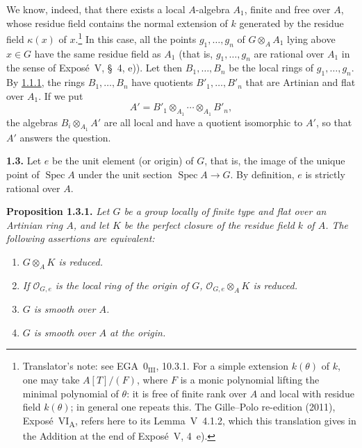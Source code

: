 \medskip
We know, indeed, that there exists a local \(A\)-algebra \(A_1\), finite
and free over \(A\), whose residue field contains the normal extension of
\(k\) generated by the residue field \(\kappa(x)\) of \(x\).\footnote{Translator's note: see EGA~\(0_{\mathrm{III}}\), 10.3.1. For a simple
extension \(k(\theta)\) of \(k\), one may take \(A[T]/(F)\), where \(F\) is a monic polynomial lifting
the minimal polynomial of \(\theta\): it is free of finite rank over \(A\) and local with residue
field \(k(\theta)\); in general one repeats this. The Gille--Polo re-edition (2011),
Exposé~VI\textsubscript{A}, refers here to its Lemma~V~4.1.2, which this translation gives in the
Addition at the end of Exposé~V, 4~e).} In this case, all the
points \(g_1,\ldots,g_n\) of \(G\otimes_A A_1\) lying above \(x\in G\)
have the same residue field as \(A_1\) (that is, \(g_1,\ldots,g_n\) are rational
over \(A_1\) in the sense of Expos\'e~V, \S~4, e)).
Let then \(B_1,\ldots,B_n\) be the local rings of \(g_1,\ldots,g_n\).
By \hyperref[prop:sga3-VIA-1.1.1]{1.1.1}, the rings
\(B_1,\ldots,B_n\) have quotients \(B'_1,\ldots,B'_n\) that are Artinian
and flat over \(A_1\). If we put
\[
  A'=B'_1\otimes_{A_1}\cdots\otimes_{A_1}B'_n,
\]
the algebras \(B_i\otimes_{A_1}A'\) are all local and have a quotient
isomorphic to \(A'\), so that \(A'\) answers the question.

\medskip
{}\label{par:sga3-VIA-1.3}%
\noindent\textbf{1.3.}
Let \(e\) be the unit element (or origin) of \(G\), that is, the image of
the unique point of \(\operatorname{Spec}A\) under the unit section
\(\operatorname{Spec}A\to G\). By definition, \(e\) is strictly rational
over \(A\).

\par\medskip
\noindent{}\label{prop:sga3-VIA-1.3.1}%
\textbf{Proposition 1.3.1.}
\textit{Let \(G\) be a group locally of finite type and flat over an
Artinian ring \(A\), and let \(K\) be the perfect closure of the residue
field \(k\) of \(A\). The following assertions are equivalent:}
\begin{enumerate}
\item[(i)] \textit{\(G\otimes_A K\) is reduced.}
\item[(i bis)] \textit{If \(\mathcal O_{G,e}\) is the local ring of the
origin of \(G\), \(\mathcal O_{G,e}\otimes_A K\) is reduced.}
\item[(ii)] \textit{\(G\) is smooth over \(A\).}
\item[(ii bis)] \textit{\(G\) is smooth over \(A\) at the origin.}
\end{enumerate}

